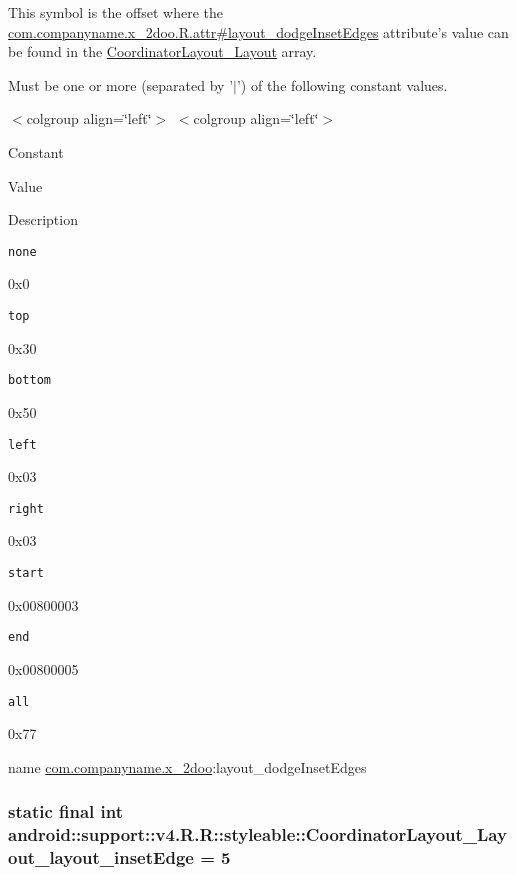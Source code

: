 This symbol is the offset where the \hyperlink{classcom_1_1companyname_1_1x__2doo_1_1_r_1_1attr_c809d052548073a02e91694193e09469}{com.companyname.x\_\-2doo.R.attr\#layout\_\-dodgeInsetEdges} attribute's value can be found in the \hyperlink{classandroid_1_1support_1_1v4_1_1_r_1_1styleable_002d98b0482bfb71440db629b16e17bf}{CoordinatorLayout\_\-Layout} array.

Must be one or more (separated by '$|$') of the following constant values. \begin{TabularC}{0}
\hline
\end{TabularC}
$<$colgroup align=\char`\"{}left\char`\"{}$>$ $<$colgroup align=\char`\"{}left\char`\"{}$>$ 

Constant

Value

Description 

{\tt none}

0x0

{\tt top}

0x30

{\tt bottom}

0x50

{\tt left}

0x03

{\tt right}

0x03

{\tt start}

0x00800003

{\tt end}

0x00800005

{\tt all}

0x77

name \hyperlink{namespacecom_1_1companyname_1_1x__2doo}{com.companyname.x\_\-2doo}:layout\_\-dodgeInsetEdges \hypertarget{classandroid_1_1support_1_1v4_1_1_r_1_1styleable_b928d3f0b1a126bfb85b144df1690720}{
\subsubsection[{CoordinatorLayout\_\-Layout\_\-layout\_\-insetEdge}]{\setlength{\rightskip}{0pt plus 5cm}static final int android::support::v4.R.R::styleable::CoordinatorLayout\_\-Layout\_\-layout\_\-insetEdge = 5}}
\label{classandroid_1_1support_1_1v4_1_1_r_1_1styleable_b928d3f0b1a126bfb85b144df1690720}


